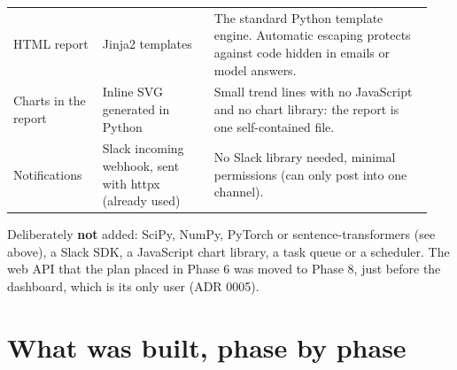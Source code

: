 \documentclass[11pt,a4paper]{article}
\begin{document}
\begin{longtable}{@{}p{0.20\linewidth}p{0.25\linewidth}p{0.49\linewidth}@{}}
HTML report & Jinja2 templates & The standard Python template engine. Automatic escaping protects against code hidden in emails or model answers. \\
Charts in the report & Inline SVG generated in Python & Small trend lines with no JavaScript and no chart library: the report is one self-contained file. \\
Notifications & Slack incoming webhook, sent with httpx (already used) & No Slack library needed, minimal permissions (can only post into one channel). \\
\bottomrule
\end{longtable}

Deliberately \textbf{not} added: SciPy, NumPy, PyTorch or sentence-transformers (see above),
a Slack SDK, a JavaScript chart library, a task queue or a scheduler. The web API that the plan
placed in Phase 6 was moved to Phase 8, just before the dashboard, which is its only user
(ADR 0005).

\section{What was built, phase by phase}
\end{document}
